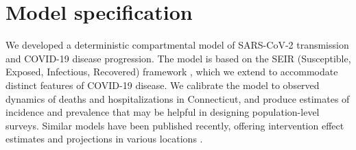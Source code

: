\documentclass[11pt]{article}
\begin{document}
\section{Model specification}

We developed a deterministic compartmental model of SARS-CoV-2 transmission and COVID-19 disease progression.
The model is based on the SEIR (Susceptible, Exposed, Infectious, Recovered) framework \citep{keeling2011modeling}, which we extend to accommodate distinct features of COVID-19 disease. We calibrate the model to observed dynamics of deaths and hospitalizations in Connecticut, and produce estimates of incidence and prevalence that may be helpful in designing population-level surveys. Similar models have been published recently, offering intervention effect estimates and projections in various locations \citep{cdc2020covid19forecasts, li2020substantial, kissler2020projecting, brett2020covid, perez2020importance, miller2020mobility, childs2020impact, salje2020estimating, salomon2020defining}.
\end{document}
